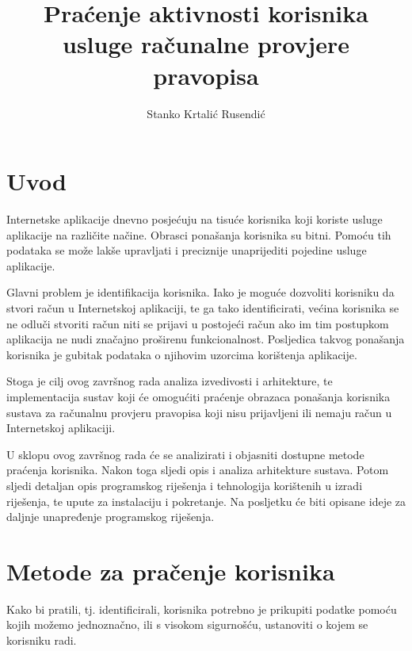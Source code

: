 \documentclass[times, utf8, zavrsni]{fer}
\begin{document}

\title{Praćenje aktivnosti korisnika usluge računalne provjere pravopisa}

\author{Stanko Krtalić Rusendić}

\maketitle


\zahvala{}

\tableofcontents

\chapter{Uvod}
Internetske aplikacije dnevno posjećuju na tisuće korisnika koji koriste
usluge aplikacije na različite načine. Obrasci ponašanja korisnika su bitni.
Pomoću tih podataka se može lakše upravljati i preciznije unaprijediti pojedine
usluge aplikacije.

Glavni problem je identifikacija korisnika. Iako je moguće dozvoliti korisniku
da stvori račun u Internetskoj aplikaciji, te ga tako identificirati, većina
korisnika se ne odluči stvoriti račun niti se prijavi u postojeći račun ako im
tim postupkom aplikacija ne nudi značajno proširenu funkcionalnost. Posljedica
takvog ponašanja korisnika je gubitak podataka o njihovim uzorcima korištenja
aplikacije.

Stoga je cilj ovog završnog rada analiza izvedivosti i arhitekture, te
implementacija sustav koji će omogućiti praćenje obrazaca ponašanja korisnika
sustava za računalnu provjeru pravopisa koji nisu prijavljeni ili nemaju račun u
Internetskoj aplikaciji.

U sklopu ovog završnog rada će se analizirati i objasniti dostupne metode
praćenja korisnika. Nakon toga sljedi opis i analiza arhitekture sustava.
Potom sljedi detaljan opis programskog riješenja i tehnologija korištenih u
izradi riješenja, te upute za instalaciju i pokretanje. Na posljetku će biti
opisane ideje za daljnje unapređenje programskog riješenja.

\chapter{Metode za pračenje korisnika}
Kako bi pratili, tj. identificirali, korisnika potrebno je prikupiti podatke
pomoću kojih možemo jednoznačno, ili s visokom sigurnošću, ustanoviti o kojem
se korisniku radi.
\end{document}
